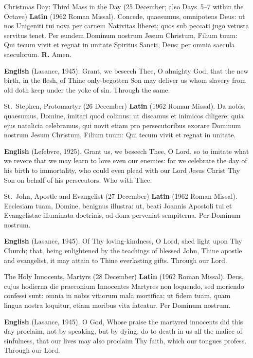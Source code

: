 \begin{massbox}{Christmas Day: Third Mass in the Day (25 December; also Days~5--7 within the Octave)}
\textbf{Latin} (1962 Roman Missal). Concede, quaesumus, omnipotens Deus: ut nos
Unigeniti tui nova per carnem Nativitas liberet; quos sub peccati jugo vetusta
servitus tenet. Per eundem Dominum nostrum Jesum Christum, Filium tuum: Qui
tecum vivit et regnat in unitate Spiritus Sancti, Deus: per omnia saecula
saeculorum. \textbf{R.} Amen.

\textbf{English} (Lasance, 1945). Grant, we beseech Thee, O almighty God, that
the new birth, in the flesh, of Thine only-begotten Son may deliver us whom
slavery from old doth keep under the yoke of sin. Through the same.
\end{massbox}

\begin{massbox}{St.~Stephen, Protomartyr (26 December)}
\textbf{Latin} (1962 Roman Missal). Da nobis, quaesumus, Domine, imitari quod
colimus: ut discamus et inimicos diligere; quia ejus natalicia celebramus, qui
novit etiam pro persecutoribus exorare Dominum nostrum Jesum Christum, Filium
tuum: Qui tecum vivit et regnat in unitate.

\textbf{English} (Lefebvre, 1925). Grant us, we beseech Thee, O Lord, so to
imitate what we revere that we may learn to love even our enemies: for we
celebrate the day of his birth to immortality, who could even plead with our
Lord Jesus Christ Thy Son on behalf of his persecutors. Who with Thee.
\end{massbox}

\begin{massbox}{St.~John, Apostle and Evangelist (27 December)}
\textbf{Latin} (1962 Roman Missal). Ecclesiam tuam, Domine, benignus illustra:
ut, beati Joannis Apostoli tui et Evangelistae illuminata doctrinis, ad dona
perveniat sempiterna. Per Dominum nostrum.

\textbf{English} (Lasance, 1945). Of Thy loving-kindness, O Lord, shed light
upon Thy Church; that, being enlightened by the teachings of blessed John, Thine
apostle and evangelist, it may attain to Thine everlasting gifts. Through our
Lord.
\end{massbox}

\begin{massbox}{The Holy Innocents, Martyrs (28 December)}
\textbf{Latin} (1962 Roman Missal). Deus, cujus hodierna die praeconium
Innocentes Martyres non loquendo, sed moriendo confessi sunt: omnia in nobis
vitiorum mala mortifica; ut fidem tuam, quam lingua nostra loquitur, etiam
moribus vita fateatur. Per Dominum nostrum.

\textbf{English} (Lasance, 1945). O God, Whose praise the martyred innocents did
this day proclaim, not by speaking, but by dying, do to death in us all the
malice of sinfulness, that our lives may also proclaim Thy faith, which our
tongues profess. Through our Lord.
\end{massbox}

